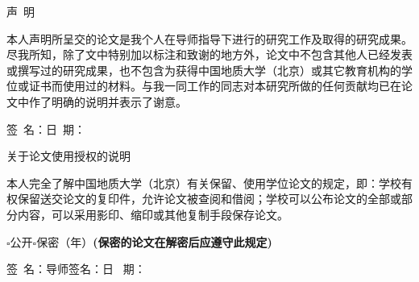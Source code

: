 ﻿%

{
\clearpage
\thispagestyle{empty}
\heiti \LARGE \centering 声~明
\vskip 15pt
\songti \normalsize \raggedright \hspace{2em}本人声明所呈交的论文是我个人在导师指导下进行的研究工作及取得的研究成果。尽我所知，除了文中特别加以标注和致谢的地方外，论文中不包含其他人已经发表或撰写过的研究成果，也不包含为获得中国地质大学（北京）或其它教育机构的学位或证书而使用过的材料。与我一同工作的同志对本研究所做的任何贡献均已在论文中作了明确的说明并表示了谢意。

\vskip 60pt
\raggedleft \fontsize{13pt}{0pt}\selectfont 签~名：\underline{\hspace{3cm}}日~期： \underline{\hspace{3cm}}

\vskip 100pt
\centering \heiti \LARGE 关于论文使用授权的说明
\vskip 10pt

\songti \normalsize \raggedright \hspace{2em}本人完全了解中国地质大学（北京）有关保留、使用学位论文的规定，即：学校有权保留送交论文的复印件，允许论文被查阅和借阅；学校可以公布论文的全部或部分内容，可以采用影印、缩印或其他复制手段保存论文。
\vskip 20pt

\hspace{2em}$\square$公开\hspace{0.5cm}$\square$保密（\underline{\hspace{1cm}}年）\hspace{1cm}\fontsize{13pt}{0pt}\selectfont \textbf{(保密的论文在解密后应遵守此规定)}

\vskip 60pt
\songti \fontsize{13pt}{0pt}\selectfont 签~名：\underline{\hspace{3cm}}导师签名：\underline{\hspace{3cm}}日~ 期：\underline{\hspace{3cm}}
}